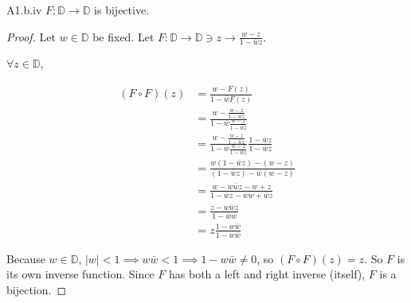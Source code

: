 \documentclass{article}
\begin{document}
\begin{claim}{A1.b.iv}\label{Claim 3biv.}
    $F: \mathbb{D} \to \mathbb{D}$ is bijective.
\end{claim}
\begin{proof}
    Let $w \in \mathbb{D}$ be fixed. Let $F: \mathbb{D} \to \mathbb{D} \ni z \to \frac{w - z}{1 - \bar{w}z}$.

    $\forall z \in \mathbb{D}$,
    
    \begin{align*}
        (F \circ F)(z) &= \frac{w - F(z)}{1 - \bar{w}F(z)} \\
        &= \frac{w - \frac{w - z}{1 - \bar{w}z}}{1 - \bar{w}\frac{w - z}{1 - \bar{w}z}} \\
        &= \frac{w - \frac{w - z}{1 - \bar{w}z}}{1 - \bar{w}\frac{w - z}{1 - \bar{w}z}} \frac{1 - \bar{w}z}{1 - \bar{w}z} \\
        &= \frac{w(1 - \bar{w}z) - (w - z)}{(1 - \bar{w}z) - \bar{w}(w - z)} \\
        &= \frac{w - w\bar{w}z - w + z}{1 - \bar{w}z - \bar{w}w + \bar{w}z} \\
        &= \frac{z - w\bar{w}z}{1 - \bar{w}w} \\
        &= z\frac{1 - w\bar{w}}{1 - w\bar{w}}
    \end{align*}

    Because $w \in \mathbb{D}$, $|w| < 1 \implies w\bar{w} < 1 \implies 1 - w\bar{w} \neq 0$, so $(F \circ F)(z) = z$. So $F$ is its own inverse function. Since $F$ has both a left and right inverse (itself), $F$ is a bijection.      
\end{proof}
\end{document}
